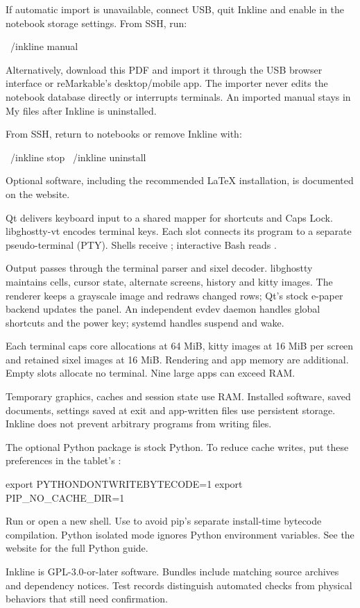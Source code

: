 If automatic import is unavailable, connect USB, quit Inkline and enable
 in the notebook storage settings. From SSH, run:
\begin{shell}
~/inkline manual
\end{shell}
Alternatively, download this PDF and import it through the USB browser
interface or reMarkable's desktop/mobile app. The importer never edits the
notebook database directly or interrupts terminals. An imported manual stays
in My files after Inkline is uninstalled.

From SSH, return to notebooks or remove Inkline with:
\begin{shell}
~/inkline stop
~/inkline uninstall
\end{shell}
Optional software, including the recommended LaTeX installation, is documented
on the website.

Qt delivers keyboard input to a shared mapper for shortcuts and Caps Lock.
libghostty-vt encodes terminal keys. Each slot connects its program to a
separate pseudo-terminal (PTY). Shells receive ;
interactive Bash reads .

Output passes through the terminal parser and sixel decoder. libghostty
maintains cells, cursor state, alternate screens, history and kitty images.
The renderer keeps a grayscale image and redraws changed rows; Qt's stock
e-paper backend updates the panel. An independent evdev daemon handles
global shortcuts and the power key; systemd handles suspend and wake.

Each terminal caps core allocations at 64 MiB, kitty images at 16 MiB per
screen and retained sixel images at 16 MiB. Rendering and app memory are
additional. Empty slots allocate no terminal. Nine large apps can exceed RAM.

Temporary graphics, caches and session state use RAM. Installed software,
saved documents, settings saved at exit and app-written files use persistent
storage. Inkline does not prevent arbitrary programs from writing files.

The optional Python package is stock Python. To reduce cache writes, put
these preferences in the tablet's :
\begin{shell}
export PYTHONDONTWRITEBYTECODE=1
export PIP_NO_CACHE_DIR=1
\end{shell}
Run  or open a new shell. Use
 to avoid pip's separate
install-time bytecode compilation. Python isolated mode ignores Python
environment variables. See the website for the full Python guide.

Inkline is GPL-3.0-or-later software. Bundles include matching source archives
and dependency notices. Test records distinguish automated checks from
physical behaviors that still need confirmation.

